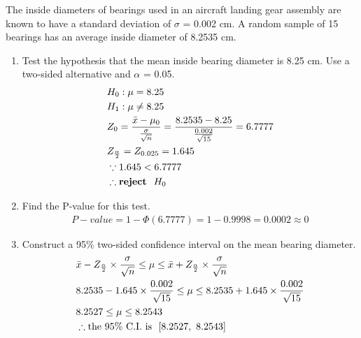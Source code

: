 The inside diameters of bearings used in an aircraft landing gear assembly are known to have a standard deviation of $\sigma$ = 0.002 cm. A random sample of 15 bearings has an average inside diameter of 8.2535 cm.

\begin{enumerate}
    \item Test the hypothesis that the mean inside bearing diameter is 8.25 cm. Use a two-sided alternative and $\alpha$ = 0.05.
        \begin{align*}
            &H_0: \mu = 8.25 \\
            &H_1: \mu \neq 8.25 \\
            &Z_0 = \frac{\Bar{x} - \mu_0}{\frac{\sigma}{\sqrt{n}}} = \frac{8.2535 - 8.25}{\frac{0.002}{\sqrt{15}}} = 6.7777 \\
            &Z_\frac{\alpha}{2} = Z_{0.025} = 1.645 \\
            &\because 1.645 < 6.7777\\
            &\therefore \textbf{reject } \ H_0
        \end{align*}

    \item Find the P-value for this test.
        \begin{align*}
            P-value = 1 - \Phi(6.7777) 
            = 1 - 0.9998
            = 0.0002
            \approx 0
        \end{align*}

    \item Construct a 95\% two-sided confidence interval on the mean bearing diameter.
        \begin{align*}
            &\Bar{x} - Z_\frac{\alpha}{2} \times \frac{\sigma}{\sqrt{n}} \leq \mu \leq \Bar{x} + Z_\frac{\alpha}{2} \times \frac{\sigma}{\sqrt{n}}\\
            &8.2535 - 1.645 \times \frac{0.002}{\sqrt{15}} \leq \mu \leq 8.2535 + 1.645 \times \frac{0.002}{\sqrt{15}} \\
            &8.2527 \leq \mu \leq 8.2543\\
            &\therefore \text{the 95\% C.I. is } \ [8.2527, \ 8.2543]
        \end{align*}
    
\end{enumerate}

\pagebreak
